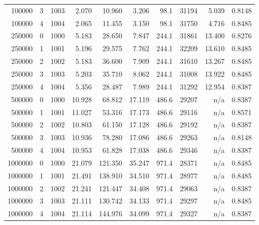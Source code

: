 \begin{table}[t]
{\begin{tabular}{rrrrrrrrrr}
100000 & 3 & 1003 & 2.070 & 10.960 & 3.206 & 98.1 & 31194 & 5.039 & 0.8148 \\
100000 & 4 & 1004 & 2.065 & 11.455 & 3.150 & 98.1 & 31750 & 4.716 & 0.8485 \\
250000 & 0 & 1000 & 5.183 & 28.650 & 7.847 & 244.1 & 31861 & 13.400 & 0.8276 \\
250000 & 1 & 1001 & 5.196 & 29.575 & 7.762 & 244.1 & 32209 & 13.610 & 0.8485 \\
250000 & 2 & 1002 & 5.183 & 36.600 & 7.909 & 244.1 & 31610 & 13.267 & 0.8485 \\
250000 & 3 & 1003 & 5.203 & 35.710 & 8.062 & 244.1 & 31008 & 13.922 & 0.8485 \\
250000 & 4 & 1004 & 5.356 & 28.487 & 7.989 & 244.1 & 31292 & 12.954 & 0.8387 \\
500000 & 0 & 1000 & 10.928 & 68.812 & 17.119 & 486.6 & 29207 & n/a & 0.8387 \\
500000 & 1 & 1001 & 11.027 & 53.316 & 17.173 & 486.6 & 29116 & n/a & 0.8571 \\
500000 & 2 & 1002 & 10.803 & 61.150 & 17.128 & 486.6 & 29192 & n/a & 0.8387 \\
500000 & 3 & 1003 & 10.936 & 78.280 & 17.086 & 486.6 & 29263 & n/a & 0.8148 \\
500000 & 4 & 1004 & 10.953 & 61.828 & 17.038 & 486.6 & 29346 & n/a & 0.8387 \\
1000000 & 0 & 1000 & 21.079 & 121.350 & 35.247 & 971.4 & 28371 & n/a & 0.8485 \\
1000000 & 1 & 1001 & 21.491 & 138.910 & 34.510 & 971.4 & 28977 & n/a & 0.8485 \\
1000000 & 2 & 1002 & 21.241 & 121.447 & 34.408 & 971.4 & 29063 & n/a & 0.8387 \\
1000000 & 3 & 1003 & 21.111 & 130.742 & 34.133 & 971.4 & 29297 & n/a & 0.8485 \\
1000000 & 4 & 1004 & 21.114 & 144.976 & 34.099 & 971.4 & 29327 & n/a & 0.8387 \\
\bottomrule
\end{tabular}
}
\end{table}
